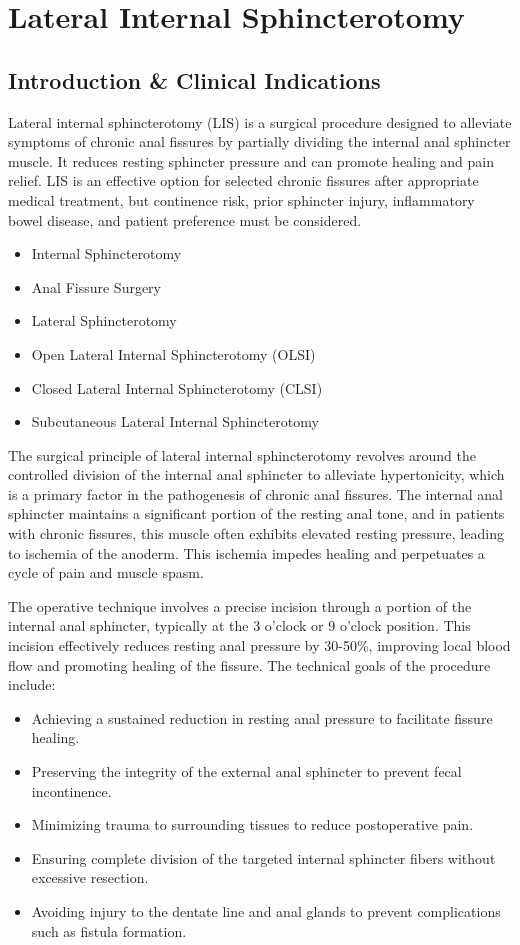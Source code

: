 \chapter{Lateral Internal Sphincterotomy}

\section*{Introduction \& Clinical Indications}
Lateral internal sphincterotomy (LIS) is a surgical procedure designed to alleviate symptoms of chronic anal fissures by partially dividing the internal anal sphincter muscle. It reduces resting sphincter pressure and can promote healing and pain relief. LIS is an effective option for selected chronic fissures after appropriate medical treatment, but continence risk, prior sphincter injury, inflammatory bowel disease, and patient preference must be considered.

\begin{itemize}
  \item Internal Sphincterotomy
  \item Anal Fissure Surgery
  \item Lateral Sphincterotomy
  \item Open Lateral Internal Sphincterotomy (OLSI)
  \item Closed Lateral Internal Sphincterotomy (CLSI)
  \item Subcutaneous Lateral Internal Sphincterotomy
\end{itemize}

The surgical principle of lateral internal sphincterotomy revolves around the controlled division of the internal anal sphincter to alleviate hypertonicity, which is a primary factor in the pathogenesis of chronic anal fissures. The internal anal sphincter maintains a significant portion of the resting anal tone, and in patients with chronic fissures, this muscle often exhibits elevated resting pressure, leading to ischemia of the anoderm. This ischemia impedes healing and perpetuates a cycle of pain and muscle spasm.

The operative technique involves a precise incision through a portion of the internal anal sphincter, typically at the 3 o'clock or 9 o'clock position. This incision effectively reduces resting anal pressure by 30-50\%, improving local blood flow and promoting healing of the fissure. The technical goals of the procedure include:

\begin{itemize}
  \item Achieving a sustained reduction in resting anal pressure to facilitate fissure healing.
  \item Preserving the integrity of the external anal sphincter to prevent fecal incontinence.
  \item Minimizing trauma to surrounding tissues to reduce postoperative pain.
  \item Ensuring complete division of the targeted internal sphincter fibers without excessive resection.
  \item Avoiding injury to the dentate line and anal glands to prevent complications such as fistula formation.
\end{itemize}

